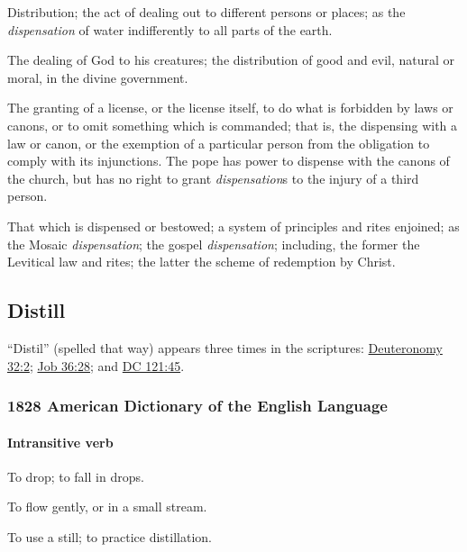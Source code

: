 			\begin{compactitem}
				\item[1] Distribution; the act of dealing out to different persons or places; as the \textit{dispensation} of water indifferently to all parts of the earth.
				\item[2] The dealing of God to his creatures; the distribution of good and evil, natural or moral, in the divine government.
				\item[3] The granting of a license, or the license itself, to do what is forbidden by laws or canons, or to omit something which is commanded; that is, the dispensing with a law or canon, or the exemption of a particular person from the obligation to comply with its injunctions. The pope has power to dispense with the canons of the church, but has no right to grant \textit{dispensation}s to the injury of a third person.
				\item[4] That which is dispensed or bestowed; a system of principles and rites enjoined; as the Mosaic \textit{dispensation}; the gospel \textit{dispensation}; including, the former the Levitical law and rites; the latter the scheme of redemption by Christ.
			\end{compactitem}

	\subsection{Distill} %
		\label{DISTIL} \label{DISTILL}
		
		``Distil'' (spelled that way) appears three times in the scriptures: \hyperref[DEUTERONOMY-32-2]{Deuteronomy 32:2}; \hyperref[JOB-36-28]{Job 36:28}; and \hyperref[DC121-45]{DC 121:45}.
		
		\subsubsection{1828 American Dictionary of the English Language}
		
			\paragraph{Intransitive verb}
		
				\begin{compactitem}
					\item[1] To drop; to fall in drops.
					\item[2] To flow gently, or in a small stream.
					\item[3] To use a still; to practice distillation.
				\end{compactitem}
				
